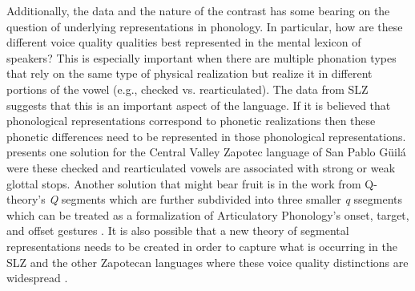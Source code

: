 \documentclass[12pt, letterpaper]{article}
\begin{document}
Additionally, the data and the nature of the contrast has some bearing on the question of underlying representations in phonology. In particular, how are these different voice quality qualities best represented in the mental lexicon of speakers? This is especially important when there are multiple phonation types that rely on the same type of physical realization but realize it in different portions of the vowel (e.g., checked vs. rearticulated). The data from SLZ suggests that this is an important aspect of the language. If it is believed that phonological representations correspond to phonetic realizations then these phonetic differences need to be represented in those phonological representations. \citet{arellanesarellanesSistemaFonologicoPropiedades2009} presents one solution for the Central Valley Zapotec language of San Pablo Güilá were these checked and rearticulated vowels are associated with strong or weak glottal stops. Another solution that might bear fruit is in the work from Q-theory's \textit{Q} segments which are further subdivided into three smaller \textit{q} ssegments \citep{shihAutosegmentalAimsSurfaceOptimizing2019} which can be treated as a formalization of Articulatory Phonology's onset, target, and offset gestures \citep{browmanNotesSyllableStructure1988, browmanArticulatoryGesturesPhonological1989, browmanArticulatoryPhonologyOverview1992}. It is also possible that a new theory of segmental representations needs to be created in order to capture what is occurring in the SLZ and the other Zapotecan languages where these voice quality distinctions are widespread \citep{ariza-garciaPhonationTypesTones2018}.


\end{document}
